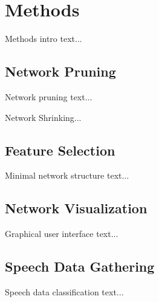 \chapter{Methods} \label{chap:methods}
Methods intro text...

\section{Network Pruning} \label{sec:network_pruning}
Network pruning text...

Network Shrinking...

\section{Feature Selection} \label{sec:feature_selection}
Minimal network structure text...

\section{Network Visualization} \label{sec:network_visualization}
Graphical user interface text...

\section{Speech Data Gathering} \label{sec:speech_data_gathering}
Speech data classification text...